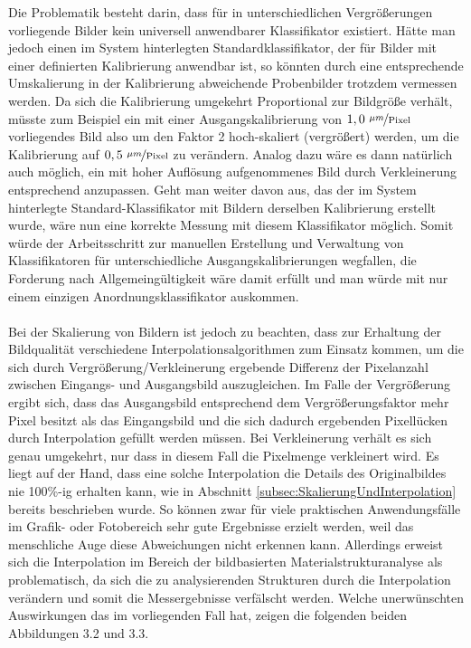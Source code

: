 \documentclass[
fontsize=10pt, 
listof = totoc,
parskip = half	
]{report}
\begin{document}
Die Problematik besteht darin, dass für in unterschiedlichen Vergrößerungen vorliegende Bilder kein universell anwendbarer Klassifikator existiert. Hätte man jedoch einen im System hinterlegten Standardklassifikator, der für Bilder mit einer definierten Kalibrierung anwendbar ist, so könnten durch eine entsprechende Umskalierung in der Kalibrierung abweichende Probenbilder trotzdem vermessen werden. Da sich die Kalibrierung umgekehrt Proportional zur Bildgröße verhält, müsste zum Beispiel ein mit einer Ausgangskalibrierung von $1,0~\nicefrac{\mu m}{\text{Pixel}}$ vorliegendes Bild also um den Faktor 2 hoch-skaliert (vergrößert) werden, um die Kalibrierung auf $0,5~\nicefrac{\mu m}{\text{Pixel}}$ zu verändern. Analog dazu wäre es dann natürlich auch möglich, ein mit hoher Auflösung aufgenommenes Bild  durch Verkleinerung entsprechend anzupassen. Geht man weiter davon aus, das der im System hinterlegte Standard-Klassifikator mit Bildern derselben Kalibrierung erstellt wurde, wäre nun eine korrekte Messung mit diesem Klassifikator möglich. Somit würde der Arbeitsschritt zur manuellen Erstellung und Verwaltung von Klassifikatoren für unterschiedliche Ausgangskalibrierungen wegfallen, die Forderung nach Allgemeingültigkeit wäre damit erfüllt und man würde mit nur einem einzigen Anordnungsklassifikator auskommen.
\\\\
Bei der Skalierung von Bildern ist jedoch zu beachten, dass zur Erhaltung der Bildqualität verschiedene Interpolationsalgorithmen zum Einsatz kommen, um die sich durch Vergrößerung/Verkleinerung ergebende Differenz der Pixelanzahl zwischen Eingangs- und Ausgangsbild auszugleichen. Im Falle der Vergrößerung ergibt sich, dass das Ausgangsbild entsprechend dem Vergrößerungsfaktor mehr Pixel besitzt als das Eingangsbild und die sich dadurch ergebenden Pixellücken durch Interpolation gefüllt werden müssen. Bei Verkleinerung verhält es sich genau umgekehrt, nur dass in diesem Fall die Pixelmenge verkleinert wird. Es liegt auf der Hand, dass eine solche Interpolation die Details des Originalbildes nie 100\%-ig erhalten kann, wie in Abschnitt \ref{subsec:SkalierungUndInterpolation} bereits beschrieben wurde. So können zwar für viele praktischen Anwendungsfälle im Grafik- oder Fotobereich sehr gute Ergebnisse erzielt werden, weil das menschliche Auge diese Abweichungen nicht erkennen kann. Allerdings erweist sich die Interpolation im Bereich der bildbasierten Materialstrukturanalyse als problematisch, da sich  die zu analysierenden Strukturen durch die Interpolation verändern und somit die Messergebnisse verfälscht werden. Welche unerwünschten Auswirkungen das im vorliegenden Fall hat, zeigen die folgenden beiden Abbildungen 3.2 und 3.3.
\end{document}
